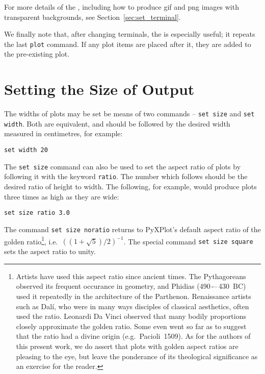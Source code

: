 For more details of the , including how to produce gif
and png images with transparent backgrounds, see
Section~\ref{sec:set_terminal}.

We finally note that, after changing terminals, the  is
especially useful; it repeats the last {\tt plot} command. If any plot items
are placed after it, they are added to the pre-existing plot.

\section{Setting the Size of Output}

The widths of plots may be set be means of two commands -- {\tt set
size} and {\tt set width}. Both are
equivalent, and should be followed by the desired width measured in
centimetres, for example:

\begin{verbatim}
set width 20
\end{verbatim}

The {\tt set size} command can also be used to set the aspect ratio of plots by
following it with the keyword {\tt ratio}. The number
which follows should be the desired ratio of height to width. The following,
for example, would produce plots three times as high as they are wide:

\begin{verbatim}
set size ratio 3.0
\end{verbatim}

\noindent The command {\tt set size noratio} returns to PyXPlot's default
aspect ratio of the golden ratio\footnote{Artists have used this aspect ratio
since ancient times. The Pythagoreans observed its frequent occurance in
geometry, and Phidias (490\,-–\,430~{\scriptsize BC}) used it repeatedly in the
architecture of the Parthenon. Renaissance artists such as Dal\'i, who were in
many ways disciples of classical aesthetics, often used the ratio.  Leonardi Da
Vinci observed that many bodily proportions closely approximate the golden
ratio. Some even went so far as to suggest that the ratio had a divine origin
(e.g.\ Pacioli~1509). As for the authors of this present work, we do assert
that plots with golden aspect ratios are pleasing to the eye, but leave the
ponderance of its theological significance as an exercise for the reader.},
i.e.\ $\left((1+\sqrt{5})/2\right)^{-1}$. The special command {\tt set size
square} sets the aspect ratio to unity.

